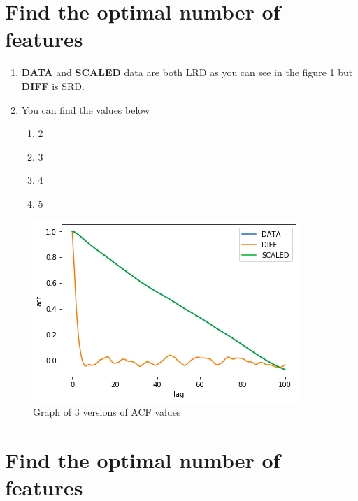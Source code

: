 \documentclass{article}
\begin{document}
\pagebreak

\section{Find the optimal number of features}

\begin{enumerate}
	\item \textbf{DATA} and \textbf{SCALED} data are both LRD as you can see in the figure 1 but \textbf{DIFF} is SRD.
	\item You can find the values below
		\begin{enumerate}
			\item 2
			\item 3
			\item 4
			\item 5
		\end{enumerate}
\end{enumerate}

\begin{figure}[htb!]
	\centering
	\includegraphics{acf-graph}
	\caption{Graph of 3 versions of ACF values}
\end{figure}

\pagebreak

\section{Find the optimal number of features}
\end{document}
